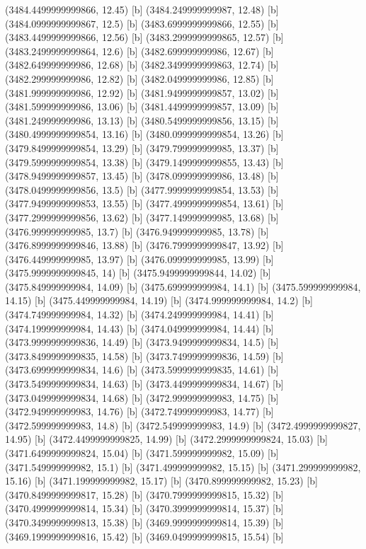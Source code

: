 {{{(3484.4499999999866, 12.45) [b] 
(3484.249999999987, 12.48) [b] 
(3484.0999999999867, 12.5) [b] 
(3483.6999999999866, 12.55) [b] 
(3483.4499999999866, 12.56) [b] 
(3483.2999999999865, 12.57) [b] 
(3483.2499999999864, 12.6) [b] 
(3482.699999999986, 12.67) [b] 
(3482.649999999986, 12.68) [b] 
(3482.3499999999863, 12.74) [b] 
(3482.299999999986, 12.82) [b] 
(3482.049999999986, 12.85) [b] 
(3481.999999999986, 12.92) [b] 
(3481.9499999999857, 13.02) [b] 
(3481.599999999986, 13.06) [b] 
(3481.4499999999857, 13.09) [b] 
(3481.249999999986, 13.13) [b] 
(3480.5499999999856, 13.15) [b] 
(3480.4999999999854, 13.16) [b] 
(3480.0999999999854, 13.26) [b] 
(3479.8499999999854, 13.29) [b] 
(3479.799999999985, 13.37) [b] 
(3479.5999999999854, 13.38) [b] 
(3479.1499999999855, 13.43) [b] 
(3478.9499999999857, 13.45) [b] 
(3478.099999999986, 13.48) [b] 
(3478.0499999999856, 13.5) [b] 
(3477.9999999999854, 13.53) [b] 
(3477.9499999999853, 13.55) [b] 
(3477.4999999999854, 13.61) [b] 
(3477.2999999999856, 13.62) [b] 
(3477.149999999985, 13.68) [b] 
(3476.999999999985, 13.7) [b] 
(3476.949999999985, 13.78) [b] 
(3476.8999999999846, 13.88) [b] 
(3476.7999999999847, 13.92) [b] 
(3476.449999999985, 13.97) [b] 
(3476.099999999985, 13.99) [b] 
(3475.9999999999845, 14) [b] 
(3475.9499999999844, 14.02) [b] 
(3475.849999999984, 14.09) [b] 
(3475.699999999984, 14.1) [b] 
(3475.599999999984, 14.15) [b] 
(3475.449999999984, 14.19) [b] 
(3474.999999999984, 14.2) [b] 
(3474.749999999984, 14.32) [b] 
(3474.249999999984, 14.41) [b] 
(3474.199999999984, 14.43) [b] 
(3474.049999999984, 14.44) [b] 
(3473.9999999999836, 14.49) [b] 
(3473.9499999999834, 14.5) [b] 
(3473.8499999999835, 14.58) [b] 
(3473.7499999999836, 14.59) [b] 
(3473.6999999999834, 14.6) [b] 
(3473.5999999999835, 14.61) [b] 
(3473.5499999999834, 14.63) [b] 
(3473.4499999999834, 14.67) [b] 
(3473.0499999999834, 14.68) [b] 
(3472.999999999983, 14.75) [b] 
(3472.949999999983, 14.76) [b] 
(3472.749999999983, 14.77) [b] 
(3472.599999999983, 14.8) [b] 
(3472.549999999983, 14.9) [b] 
(3472.4999999999827, 14.95) [b] 
(3472.4499999999825, 14.99) [b] 
(3472.2999999999824, 15.03) [b] 
(3471.6499999999824, 15.04) [b] 
(3471.599999999982, 15.09) [b] 
(3471.549999999982, 15.1) [b] 
(3471.499999999982, 15.15) [b] 
(3471.299999999982, 15.16) [b] 
(3471.199999999982, 15.17) [b] 
(3470.899999999982, 15.23) [b] 
(3470.8499999999817, 15.28) [b] 
(3470.7999999999815, 15.32) [b] 
(3470.4999999999814, 15.34) [b] 
(3470.3999999999814, 15.37) [b] 
(3470.3499999999813, 15.38) [b] 
(3469.9999999999814, 15.39) [b] 
(3469.1999999999816, 15.42) [b] 
(3469.0499999999815, 15.54) [b] 
}}}

